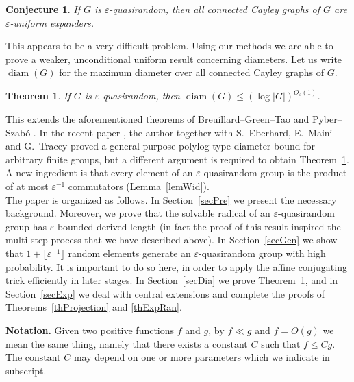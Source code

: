 \documentclass[11pt,reqno]{amsart}
\numberwithin{equation}{section}
\newtheorem{theorem}{Theorem}[section]
\newtheorem*{conjecture}{Conjecture}
\theoremstyle{definition}
\theoremstyle{remark}
\newcommand{\diam}{\mathop{\mathrm{diam}}}
\begin{document}
\begin{conjecture} \label{conjUnif}
If $G$ is $\varepsilon$-quasirandom,
then all connected Cayley graphs of $G$ are $\varepsilon$-uniform expanders.
\end{conjecture}

This appears to be a very difficult problem.
Using our methods we are able to prove a weaker, unconditional uniform result concerning diameters.
Let us write $\diam(G)$ for the maximum diameter over all connected Cayley graphs of $G$.

\begin{theorem} \label{thDiam} 
If $G$ is $\varepsilon$-quasirandom,
then $\diam(G) \leq (\log|G|)^{O_\varepsilon(1)}$.
\end{theorem} 

This extends the aforementioned
theorems of Breuillard--Green--Tao \cite{BGT11} and Pyber--Szab\'o \cite{PS16}.
In the recent paper \cite{EMST26},
the author together with S.~Eberhard, E.~Maini and G.~Tracey
proved a general-purpose polylog-type diameter bound for arbitrary finite groups,
but a different argument is required to obtain Theorem~\ref{thDiam}.
A new ingredient
is that every element of an $\varepsilon$-quasirandom group
is the product of at most $\varepsilon^{-1}$ commutators (Lemma~\ref{lemWid}).\\

The paper is organized as follows.
In Section~\ref{secPre} we present the necessary background.
Moreover, we prove that the solvable radical of an $\varepsilon$-quasirandom group
has $\varepsilon$-bounded derived length
(in fact the proof of this result inspired the multi-step process that we have described above).
In Section~\ref{secGen} we show that
$1+\lfloor \varepsilon^{-1} \rfloor$ random elements generate an $\varepsilon$-quasirandom group with high probability.
It is important to do so here, in order to apply the affine conjugating trick efficiently in later stages.
In Section~\ref{secDia} we prove Theorem~\ref{thDiam},
and in Section~\ref{secExp} we deal with central extensions and complete the proofs of
Theorems~\ref{thProjection} and \ref{thExpRan}.

\vspace{0.1cm} \noindent
{\bfseries Notation.}
Given two positive functions $f$ and $g$,
by $f \ll g$ and $f = O(g)$ we mean the same thing,
namely that there exists a constant $C$ such that $f \leq C g$.
The constant $C$ may depend on one or more parameters which we indicate in subscript.
\end{document}
